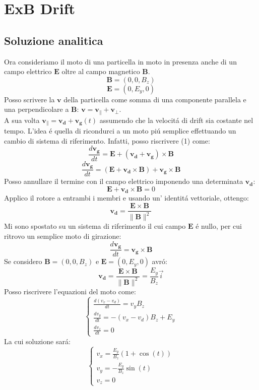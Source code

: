 \documentclass[11pt]{article}
\begin{document}
\section{ExB Drift}
\subsection{Soluzione analitica}
Ora consideriamo il moto di una particella in moto in presenza anche di un campo elettrico $\mathbf{E}$ oltre al campo magnetico $\mathbf{B}$. \\ 
$$\mathbf{B}=(0,0,B_z)    $$
$$\mathbf{E}=(0,E_y,0)  $$
Posso scrivere la $\mathbf{v}$ della particella come somma di una componente parallela e una perpendicolare a $\mathbf{B}$: 
$\mathbf{v} = \mathbf{v_{\parallel}} + \mathbf{v_{\perp}}$. \\
A sua volta $\mathbf{v_{\parallel}} = \mathbf{v_d} + \mathbf{v_g}(t)$
assumendo che la velocitá di drift sia costante nel tempo.
L'idea é quella di ricondurci a un moto piú semplice effettuando un cambio di sistema di riferimento.
Infatti, posso riscrivere (1) come:
$$ 
\frac{d\mathbf{v_g}}{dt} = \mathbf{E} + (\mathbf{v_d} + \mathbf{v_g}) \times \mathbf{B}$$
$$
\frac{d\mathbf{v_g}}{dt} = \left(\mathbf{E} + \mathbf{v_d} \times \mathbf{B}\right) + \mathbf{v_g} \times \mathbf{B}
$$
Posso annullare il termine con il campo elettrico imponendo una determinata $\mathbf{v_d}$:
$$
\mathbf{E} + \mathbf{v_d} \times \mathbf{B} = 0
$$
Applico il rotore a entrambi i membri e usando un' identitá vettoriale, ottengo:
$$
\mathbf{v_d} = \frac{\mathbf{E} \times \mathbf{B}}{\|\mathbf{B}\|^2}
$$
Mi sono spostato su un sistema di riferimento il cui campo $\mathbf{E}$ é nullo, per cui ritrovo un semplice moto di girazione:
$$
\frac{d\mathbf{v_g}}{dt} = \mathbf{v_g} \times \mathbf{B}
$$
Se considero $\mathbf{B}=(0,0,B_z)$ e $\mathbf{E}=(0,E_y,0)$ avró:
$$
\mathbf{v_d} = \frac{\mathbf{E} \times \mathbf{B}}{\|\mathbf{B}\|^2} = \frac{E_y}{B_z} \vec{i}
$$  
Posso riscrivere l'equazioni del moto come:
$$
\begin{cases} 
\frac{d(v_x - v_d)}{dt}=v_y B_z \\ 
\frac{dv_y}{dt}=-(v_x - v_d)B_z + E_y  \\ 
\frac{dv_z}{dt}=0 
\end{cases}
$$
La cui soluzione sará:
$$
\begin{cases}
v_x = \frac{E_y}{B_z} (1 + \cos(t)) \\
v_y = - \frac{E_y}{B_z}\sin(t) \\
v_z = 0 
\end{cases}
$$
\end{document}
